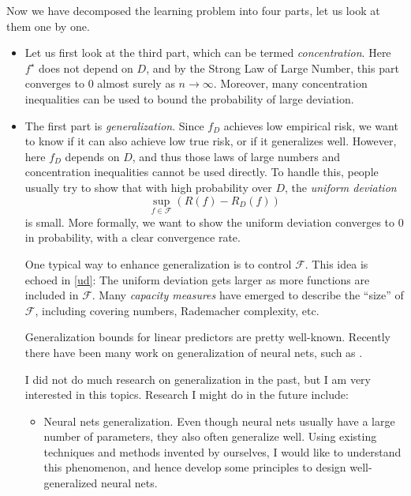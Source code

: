 \documentclass{article}
\theoremstyle{definition}
\theoremstyle{remark}
\begin{document}
Now we have decomposed the learning problem into four parts, let us look at them one by one.
\begin{itemize}
    \item Let us first look at the third part, which can be termed \emph{concentration}. Here $f^{\star}$ does not depend on $D$, and by the Strong Law of Large Number, this part converges to $0$ almost surely as $n\to\infty$. Moreover, many concentration inequalities can be used to bound the probability of large deviation.

    \item The first part is \emph{generalization}. Since $f_D$ achieves low empirical risk, we want to know if it can also achieve low true risk, or if it generalizes well. However, here $f_D$ depends on $D$, and thus those laws of large numbers and concentration inequalities cannot be used directly. To handle this, people usually try to show that with high probability over $D$, the \emph{uniform deviation}
    \begin{equation}\label{ud}
        \sup_{f\in \mathcal{F}}\left(R(f)-R_D(f)\right)
    \end{equation}
    is small. More formally, we want to show the uniform deviation converges to $0$ in probability, with a clear convergence rate.

    One typical way to enhance generalization is to control $\mathcal{F}$. This idea is echoed in \eqref{ud}: The uniform deviation gets larger as more functions are included in $\mathcal{F}$. Many \emph{capacity measures} have emerged to describe the ``size'' of $\mathcal{F}$, including covering numbers, Rademacher complexity, etc.

    Generalization bounds for linear predictors are pretty well-known. Recently there have been many work on generalization of neural nets, such as \cite{BFT17, GRS17, AGNZ18}.

    I did not do much research on generalization in the past, but I am very interested in this topics. Research I might do in the future include:
    \begin{itemize}
        \item Neural nets generalization. Even though neural nets usually have a large number of parameters, they also often generalize well. Using existing techniques and methods invented by ourselves, I would like to understand this phenomenon, and hence develop some principles to design well-generalized neural nets.


\end{itemize}
\end{itemize}
\end{document}
